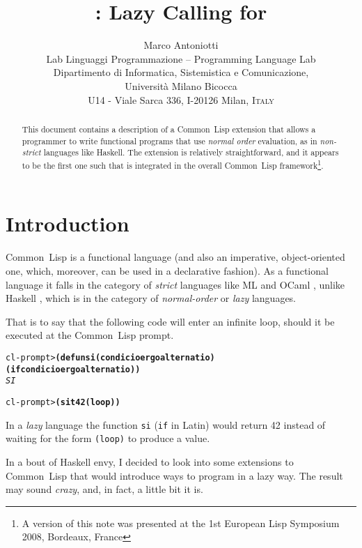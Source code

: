 \documentclass[fleqn,10pt]{article}
\title{
\LARGE{\bfseries \CLAZY{}: Lazy Calling for \CL{}}}
\author{
Marco Antoniotti\\
\small Lab Linguaggi Programmazione -- Programming Language Lab \PLL{}\\
\small Dipartimento di Informatica, Sistemistica e Comunicazione,\\
\small Universit\`{a} Milano Bicocca\\
\small U14 - Viale Sarca 336, I-20126 Milan, \textsc{Italy}}
\date{}
\newcommand{\CL}{\textsf{Common~Lisp}}
\newcommand{\CLAZY}{\textsf{CLAZY}}
\newcommand{\code}[1]{\texttt{#1}}
\newcommand{\PLL}{}
\begin{document}
\pagestyle{empty}

\maketitle

\begin{abstract}
This document contains a description of a \CL{} extension that allows
a programmer to write functional programs that use \emph{normal order}
evaluation, as in \emph{non-strict} languages like Haskell.  The
extension is relatively straightforward, and it appears to be the
first one such that is integrated in the overall \CL{}
framework\footnote{A version of this note was presented at the
  1st European Lisp Symposium 2008, Bordeaux, France}.
\end{abstract}


\rhead[]{\textit{\CLAZY{}: Lazy Calling\ldots}}
\chead[]{\PLL}



\pagestyle{fancy}

\section{Introduction}

\CL{} is a functional language (and also an imperative,
object-oriented one, which, moreover, can be used in a declarative
fashion).  As a functional language it falls in the category of
\emph{strict} languages like ML \cite{milner97:_def_standard_ml} and
OCaml \cite{leroy14:_ocaml}, unlike Haskell \cite{Haskell2010}, which
is in the category of \emph{normal-order} or \emph{lazy} languages.

That is to say that the following code will enter an infinite loop,
should it be executed at the \CL{} prompt.
\begin{alltt}

    cl-prompt> \textbf{(defun si (condicio ergo alternatio)
                  (if condicio ergo alternatio))}
    \textit{SI}

    cl-prompt> \textbf{(si t 42 (loop))}
\end{alltt}
In a \emph{lazy} language the function \code{si} (\code{if}
in Latin) would return 42 instead of waiting for the form
\code{(loop)} to produce a value.

In a bout of Haskell envy, I decided to look into some extensions to
\CL{} that would introduce ways to program in a lazy way. The result
may sound \emph{crazy}, and, in fact, a little bit it is.
\end{document}
